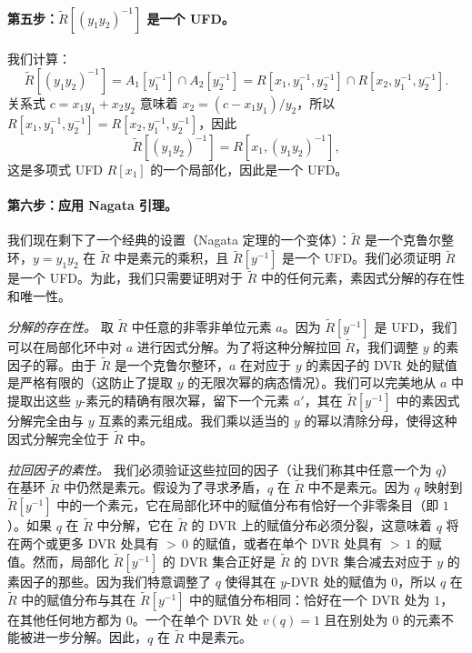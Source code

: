 ﻿\documentclass[]{pkuai4m}
\theoremstyle{plain}
\theoremstyle{definition}
\begin{document}
\paragraph{第五步：$\tilde{R}[(y_1 y_2)^{-1}]$ 是一个 UFD。} 我们计算：
\[
\tilde{R}[(y_1 y_2)^{-1}] = A_1[y_1^{-1}] \cap A_2[y_2^{-1}] = R[x_1, y_1^{-1}, y_2^{-1}] \cap R[x_2, y_1^{-1}, y_2^{-1}].
\]
关系式 $c = x_1 y_1 + x_2 y_2$ 意味着 $x_2 = (c - x_1 y_1)/y_2$，所以 $R[x_1, y_1^{-1}, y_2^{-1}] = R[x_2, y_1^{-1}, y_2^{-1}]$，因此
\[
\tilde{R}[(y_1 y_2)^{-1}] = R[x_1, (y_1 y_2)^{-1}],
\]
这是多项式 UFD $R[x_1]$ 的一个局部化，因此是一个 UFD。

\paragraph{第六步：应用 Nagata 引理。} 我们现在剩下了一个经典的设置（Nagata 定理的一个变体）：$\tilde{R}$ 是一个克鲁尔整环，$y = y_1 y_2$ 在 $\tilde{R}$ 中是素元的乘积，且 $\tilde{R}[y^{-1}]$ 是一个 UFD。我们必须证明 $\tilde{R}$ 是一个 UFD。为此，我们只需要证明对于 $\tilde{R}$ 中的任何元素，素因式分解的存在性和唯一性。

\emph{分解的存在性。} 取 $\tilde{R}$ 中任意的非零非单位元素 $a$。因为 $\tilde{R}[y^{-1}]$ 是 UFD，我们可以在局部化环中对 $a$ 进行因式分解。为了将这种分解拉回 $\tilde{R}$，我们调整 $y$ 的素因子的幂。由于 $\tilde{R}$ 是一个克鲁尔整环，$a$ 在对应于 $y$ 的素因子的 DVR 处的赋值是严格有限的（这防止了提取 $y$ 的无限次幂的病态情况）。我们可以完美地从 $a$ 中提取出这些 $y$-素元的精确有限次幂，留下一个元素 $a'$，其在 $\tilde{R}[y^{-1}]$ 中的素因式分解完全由与 $y$ 互素的素元组成。我们乘以适当的 $y$ 的幂以清除分母，使得这种因式分解完全位于 $\tilde{R}$ 中。

\emph{拉回因子的素性。} 我们必须验证这些拉回的因子（让我们称其中任意一个为 $q$）在基环 $\tilde{R}$ 中仍然是素元。假设为了寻求矛盾，$q$ 在 $\tilde{R}$ 中不是素元。因为 $q$ 映射到 $\tilde{R}[y^{-1}]$ 中的一个素元，它在局部化环中的赋值分布有恰好一个非零条目（即 $1$）。如果 $q$ 在 $\tilde{R}$ 中分解，它在 $\tilde{R}$ 的 DVR 上的赋值分布必须分裂，这意味着 $q$ 将在两个或更多 DVR 处具有 ${>}\,0$ 的赋值，或者在单个 DVR 处具有 ${>}\,1$ 的赋值。然而，局部化 $\tilde{R}[y^{-1}]$ 的 DVR 集合正好是 $\tilde{R}$ 的 DVR 集合减去对应于 $y$ 的素因子的那些。因为我们特意调整了 $q$ 使得其在 $y$-DVR 处的赋值为 $0$，所以 $q$ 在 $\tilde{R}$ 中的赋值分布与其在 $\tilde{R}[y^{-1}]$ 中的赋值分布相同：恰好在一个 DVR 处为 $1$，在其他任何地方都为 $0$。一个在单个 DVR 处 $v(q) = 1$ 且在别处为 $0$ 的元素不能被进一步分解。因此，$q$ 在 $\tilde{R}$ 中是素元。
\end{document}
